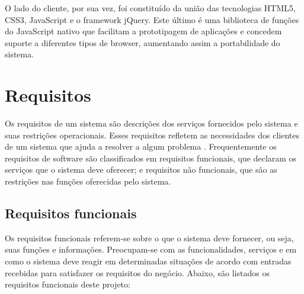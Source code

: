 \documentclass[cic,tc]{iiufrgs}
\begin{document}
O lado do cliente, por sua vez, foi constituído da união das tecnologias HTML5, CSS3, JavaScript e o framework jQuery. Este último é uma biblioteca de funções do JavaScript nativo que facilitam a prototipagem de aplicações e concedem suporte a diferentes tipos de browser, aumentando assim a portabilidade do sistema.


\section{Requisitos}
\label{metodologiaRequisitos}
Os requisitos de um sistema são descrições dos serviços fornecidos pelo sistema e suas restrições operacionais. Esses requisitos refletem as necessidades dos clientes de um sistema que ajuda a resolver a algum problema \cite{sommerville}. Frequentemente os requisitos de software são classificados em requisitos funcionais, que declaram os serviços que o sistema deve oferecer; e requisitos não funcionais, que são as restrições nas funções oferecidas pelo sistema. 

\subsection{Requisitos funcionais}
\label{requisitosRF}
Os requisitos funcionais referem-se sobre o que o sistema deve fornecer, ou seja, suas funções e informações. Preocupam-se com as funcionalidades, serviços e em como o sistema deve reagir em determinadas situações de acordo com entradas recebidas para satisfazer os requisitos do negócio. Abaixo, são listados os requisitos funcionais deste projeto:  
\end{document}
